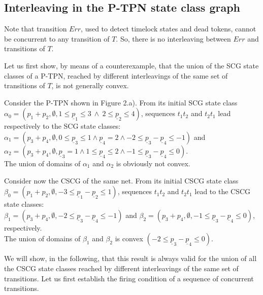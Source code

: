 \documentclass[submission,copyright,creativecommons]{eptcs}
\numberwithin{equation}{section}
\begin{document}
\subsection{Interleaving in the P-TPN state class graph}
Note that transition $Err$, used to detect timelock states and dead tokens, cannot be concurrent to any transition of $T$. So, there is no interleaving between $Err$ and transitions of $T$.
\par Let us first show, by means of a counterexample, that the union of the SCG state classes of a P-TPN, reached by different interleavings of the same set of transitions of $T$, is not generally convex.
\par Consider the P-TPN shown in Figure 2.a). From its
initial SCG state class $\alpha_0=(p_1+p_2, \emptyset, 1 \leq \underline{p}_1 \leq 3 \
\wedge \ 2 \leq \underline{p}_2 \leq 4)$, sequences $t_1t_2$ and $t_2t_1$ lead
respectively to the SCG state classes: \\ $\alpha_1 = (p_3+p_4, \emptyset, 0 \leq \underline{p}_3
\leq 1 \wedge \underline{p}_4=2 \wedge -2 \leq \underline{p}_3-\underline{p}_4 \leq -1)$ and \\ $\alpha_2
= (p_3+p_4, \emptyset, \underline{p}_3=1 \wedge 1 \leq \underline{p}_4 \leq 2 \wedge -1 \leq \underline{p}_3-\underline{p}_4 \leq 0)$.\\ The union of domains of $\alpha_1$ and $\alpha_2$ is obviously not convex.
\par Consider now the CSCG of the same net. From its initial CSCG state class $\beta_0=(p_1+p_2, \emptyset, -3 \leq \underline{p}_1 - \underline{p}_2 \leq 1)$, sequences $t_1t_2$ and $t_2t_1$ lead to the CSCG state classes:\\ $\beta_1 = (p_3+p_4, \emptyset, -2 \leq \underline{p}_3-\underline{p}_4 \leq -1)$ and $\beta_2 = (p_3+p_4, \emptyset, -1 \leq \underline{p}_3-\underline{p}_4 \leq 0)$, respectively.\\ The union of domains of $\beta_1$ and $\beta_2$ is convex $(-2 \leq \underline{p}_3-\underline{p}_4 \leq 0)$.
\par We will show, in the following, that this result is always valid for the union of all the CSCG state classes reached by different interleavings of the same set of transitions. Let us first establish the firing condition of a sequence of concurrent transitions.
\end{document}
